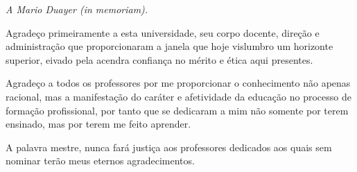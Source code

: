 
\begin{dedicatoria}
	\vspace*{\fill}
	\centering
	\noindent
	\textit{A Mario Duayer (in memoriam).} \vspace*{\fill}
\end{dedicatoria}

\begin{agradecimentos}

	Agradeço primeiramente a esta universidade, seu corpo docente, direção e administração que proporcionaram a janela que hoje vislumbro um horizonte superior, eivado pela acendra confiança no mérito e ética aqui presentes. 
	
	Agradeço a todos os professores por me proporcionar o conhecimento não apenas racional, mas a manifestação do caráter e afetividade da educação no processo de formação profissional, por tanto que se dedicaram a mim não somente por terem ensinado, mas por terem me feito aprender.
	
	A palavra mestre, nunca fará justiça aos professores dedicados aos quais sem nominar terão meus eternos agradecimentos.

\end{agradecimentos}